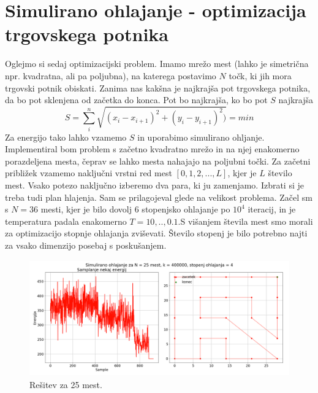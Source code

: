 \documentclass[11pt, a4paper]{article}
\begin{document}
\section{Simulirano ohlajanje - optimizacija trgovskega potnika}
Oglejmo si sedaj optimizacijski problem. Imamo mrežo mest (lahko je simetrična npr. kvadratna, ali pa poljubna), na katerega postavimo $N$ točk, ki jih mora trgovski potnik obiskati. Zanima nas kakšna je najkrajša pot trgovskega potnika, da bo pot sklenjena od začetka do konca. Pot bo najkrajša, ko bo pot $S$ najkrajša 
\begin{equation}
S = \sum_i^n \sqrt{(x_i -x_{i+1})^2 + (y_i -y_{i+1})^2)} = min
\end{equation}
Za energijo tako lahko vzamemo $S$ in uporabimo simulirano ohljanje. Implementiral bom problem s začetno kvadratno mrežo in na njej enakomerno porazdeljena mesta, čeprav se lahko mesta nahajajo na poljubni točki. Za začetni približek vzamemo naključni vrstni red mest $[0,1,2,...,L]$, kjer je $L$ število mest.\newline\newline
Vsako potezo naključno izberemo dva para, ki ju zamenjamo. Izbrati si je treba tudi plan hlajenja. Sam se prilagojeval glede na velikost problema. 
Začel sm s $N =36$ mesti, kjer je bilo dovolj 6 stopenjsko ohlajanje po $10^4$ iteracij, in je temperatura padala enakomerno $T = 10,..,0.1$.\newline\newline S višanjem števila mest smo morali za optimizacijo stopnje ohlajanja zviševati. Število stopenj je bilo potrebno najti za vsako dimenzijo posebaj s poskušanjem.
  
 \begin{figure}[H]
\centering
  \includegraphics[width=17cm, height=5cm]{tretja_N25.png}
\caption{Rešitev za 25 mest.}
\end{figure} 
\end{document}
